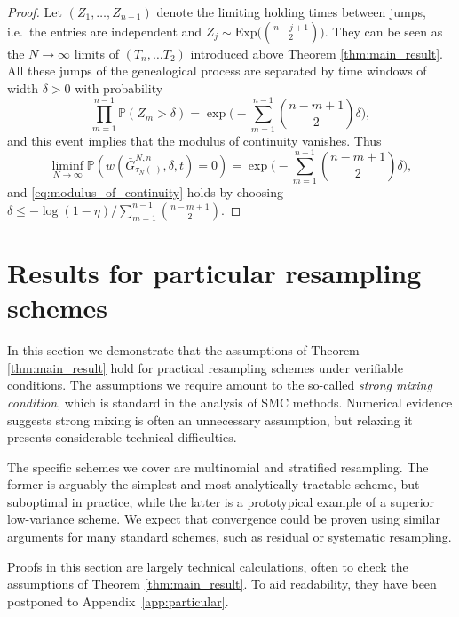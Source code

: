 \documentclass[a4paper,11pt]{article}
\theoremstyle{definition}
\newcommand{\bbP}{\mathbb{P}}
\begin{document}
\begin{proof}
Let $( Z_1, \ldots, Z_{ n - 1 } )$ denote the limiting holding times between jumps, i.e.\ the entries are independent and $Z_j \sim \text{Exp}\big( \binom{ n - j + 1 }{ 2 } \big)$.
They can be seen as the $N \to \infty$ limits of $( T_n, \ldots T_2 )$ introduced above Theorem \ref{thm:main_result}.
All these jumps of the genealogical process are separated by time windows of width $\delta > 0$ with probability 
\begin{equation*}
\prod_{ m = 1 }^{ n - 1 } \bbP( Z_m > \delta ) = \exp\Bigg( - \sum_{ m = 1 }^{ n - 1 } \binom{ n - m + 1 }{ 2 } \delta \Bigg),
\end{equation*}
and this event implies that the modulus of continuity vanishes.
Thus
\begin{equation*}
\liminf_{ N \to \infty } \bbP( w( \bar{ G }_{ \tau_N( \cdot ) }^{ N, n }, \delta, t ) = 0 ) = \exp\Bigg( - \sum_{ m = 1 }^{ n - 1 } \binom{ n - m + 1 }{ 2 } \delta \Bigg),
\end{equation*}
and \eqref{eq:modulus_of_continuity} holds by choosing $\delta \leq - \log( 1 - \eta ) / \sum_{ m = 1 }^{ n - 1 } \binom{ n - m + 1 }{ 2 }$.
\end{proof}

\section{Results for particular resampling schemes}\label{section:resampling_schemes}

In this section we demonstrate that the assumptions of Theorem \ref{thm:main_result} hold for practical resampling schemes under verifiable conditions.
The assumptions we require amount to the so-called \emph{strong mixing condition}, which is standard in the analysis of SMC methods.
Numerical evidence suggests strong mixing is often an unnecessary assumption, but relaxing it presents considerable technical difficulties.

The specific schemes we cover are multinomial and stratified resampling.
The former is arguably the simplest and most analytically tractable scheme, but suboptimal in practice, while the latter is a prototypical example of a superior low-variance scheme.
We expect that convergence could be proven using similar arguments for many standard schemes, such as residual or systematic resampling.

Proofs in this section are largely technical calculations, often to check the assumptions of Theorem \ref{thm:main_result}.
To aid readability, they have been postponed to Appendix~\ref{app:particular}.
\end{document}
